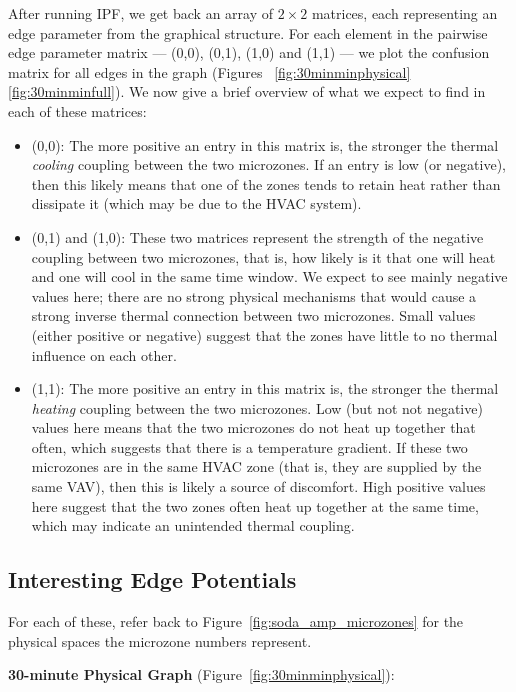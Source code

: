 After running IPF, we get back an array of $2\times 2$ matrices, each representing an edge parameter from the graphical structure.
For each element in the pairwise edge parameter matrix --- (0,0), (0,1), (1,0) and (1,1) --- we plot the confusion matrix for all edges in the graph (Figures ~\ref{fig:30minminphysical}\ref{fig:30minminfull}).
We now give a brief overview of what we expect to find in each of these matrices:

\begin{itemize}[noitemsep,nolistsep]
\item (0,0): The more positive an entry in this matrix is, the stronger the thermal \emph{cooling} coupling between the two microzones.
If an entry is low (or negative), then this likely means that one of the zones tends to retain heat rather than dissipate it (which may be due to the HVAC system).
\item (0,1) and (1,0): These two matrices represent the strength of the negative coupling between two microzones, that is, how likely is it that one will heat and one will cool in the same time window.
We expect to see mainly negative values here; there are no strong physical mechanisms that would cause a strong inverse thermal connection between two microzones.
Small values (either positive or negative) suggest that the zones have little to no thermal influence on each other.
\item (1,1): The more positive an entry in this matrix is, the stronger the thermal \emph{heating} coupling between the two microzones.
Low (but not not negative) values here means that the two microzones do not heat up together that often, which suggests that there is a temperature gradient.
If these two microzones are in the same HVAC zone (that is, they are supplied by the same VAV), then this is likely a source of discomfort.
High positive values here suggest that the two zones often heat up together at the same time, which may indicate an unintended thermal coupling.
\end{itemize}

\subsection{Interesting Edge Potentials}

For each of these, refer back to Figure~\ref{fig:soda_amp_microzones} for the physical spaces the microzone numbers represent.

\textbf{30-minute Physical Graph} (Figure~\ref{fig:30minminphysical}):

